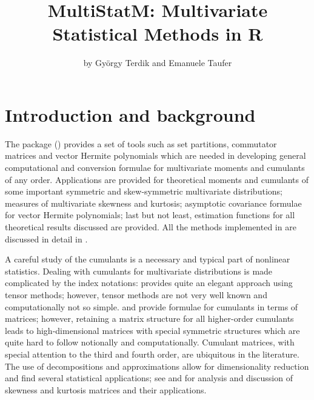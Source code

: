 \title{MultiStatM: Multivariate Statistical Methods in R}


\author{by György Terdik and Emanuele Taufer}

\maketitle


\hypertarget{introduction-and-background}{%
\section{Introduction and background}\label{introduction-and-background}}

The package  (\citet{Taufer22}) provides a set of tools such as set partitions, commutator matrices and vector Hermite polynomials which are needed in developing general computational and conversion formulae for multivariate moments and cumulants of any order. Applications are provided for theoretical moments and cumulants of some important symmetric and skew-symmetric multivariate distributions; measures of multivariate skewness and kurtosis; asymptotic covariance formulae for vector Hermite polynomials; last but not least, estimation functions for all theoretical results discussed are provided. All the methods implemented in  are discussed in detail in \citet{terdik2021multivariate}.

A careful study of the cumulants is a necessary and typical part of nonlinear statistics.
Dealing with cumulants for multivariate distributions is made complicated by
the index notations: \citet{mccullagh2018tensor} provides quite an elegant approach using tensor methods; however, tensor methods are not very well known and computationally not so simple. \citet{kollo2008multivariate} and \citet{mori1994multivariate} provide formulae for cumulants in terms of matrices; however, retaining a matrix structure for all higher-order cumulants leads to high-dimensional matrices with special symmetric structures which are quite hard to follow notionally and computationally. Cumulant matrices, with special attention to the third and fourth order, are ubiquitous in the literature. The use of decompositions and approximations allow for dimensionality reduction and find several statistical applications; see \citet{Loperfido15} and \citet{Loperfido17} for analysis and discussion of skewness and kurtosis matrices and their applications.

